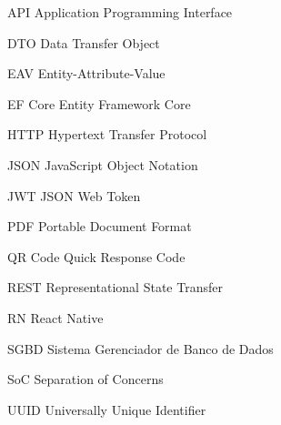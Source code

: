 \begin{siglas}
 \item[API] Application Programming Interface
 \item[DTO] Data Transfer Object
 \item[EAV] Entity-Attribute-Value
 \item[EF Core] Entity Framework Core
 \item[HTTP] Hypertext Transfer Protocol
 \item[JSON] JavaScript Object Notation
 \item[JWT] JSON Web Token
 \item[PDF] Portable Document Format
 \item[QR Code] Quick Response Code
 \item[REST] Representational State Transfer
 \item[RN] React Native
 \item[SGBD] Sistema Gerenciador de Banco de Dados
 \item[SoC] Separation of Concerns
 \item[UUID] Universally Unique Identifier
\end{siglas}
